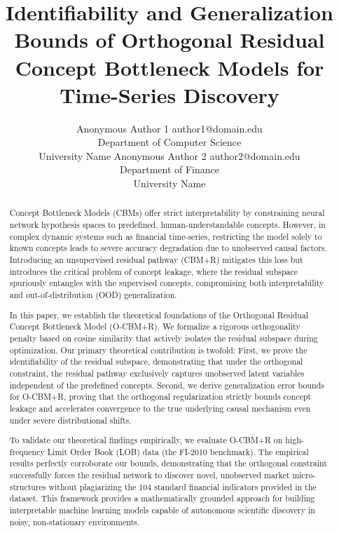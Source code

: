 \documentclass[twoside,11pt]{article}
\begin{document}
\title{Identifiability and Generalization Bounds of Orthogonal Residual Concept Bottleneck Models for Time-Series Discovery}

\author{\name Anonymous Author 1 \email author1@domain.edu \\
       \addr Department of Computer Science\\
       University Name
       \AND
       \name Anonymous Author 2 \email author2@domain.edu \\
       \addr Department of Finance\\
       University Name}


\maketitle

\begin{abstract}%
Concept Bottleneck Models (CBMs) offer strict interpretability by constraining neural network hypothesis spaces to predefined, human-understandable concepts. However, in complex dynamic systems such as financial time-series, restricting the model solely to known concepts leads to severe accuracy degradation due to unobserved causal factors. Introducing an unsupervised residual pathway (CBM+R) mitigates this loss but introduces the critical problem of concept leakage, where the residual subspace spuriously entangles with the supervised concepts, compromising both interpretability and out-of-distribution (OOD) generalization. 

In this paper, we establish the theoretical foundations of the Orthogonal Residual Concept Bottleneck Model (O-CBM+R). We formalize a rigorous orthogonality penalty based on cosine similarity that actively isolates the residual subspace during optimization. Our primary theoretical contribution is twofold: First, we prove the identifiability of the residual subspace, demonstrating that under the orthogonal constraint, the residual pathway exclusively captures unobserved latent variables independent of the predefined concepts. Second, we derive generalization error bounds for O-CBM+R, proving that the orthogonal regularization strictly bounds concept leakage and accelerates convergence to the true underlying causal mechanism even under severe distributional shifts. 

To validate our theoretical findings empirically, we evaluate O-CBM+R on high-frequency Limit Order Book (LOB) data (the FI-2010 benchmark). The empirical results perfectly corroborate our bounds, demonstrating that the orthogonal constraint successfully forces the residual network to discover novel, unobserved market micro-structures without plagiarizing the 104 standard financial indicators provided in the dataset. This framework provides a mathematically grounded approach for building interpretable machine learning models capable of autonomous scientific discovery in noisy, non-stationary environments.
\end{abstract}
\end{document}
